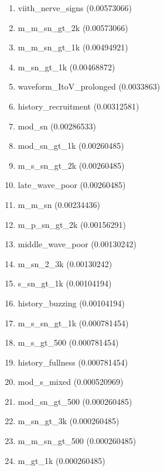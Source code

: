 \begin{enumerate}
\item viith\_nerve\_signs (0.00573066)
\item m\_m\_sn\_gt\_2k (0.00573066)
\item m\_m\_sn\_gt\_1k (0.00494921)
\item m\_sn\_gt\_1k (0.00468872)
\item waveform\_ItoV\_prolonged (0.0033863)
\item history\_recruitment (0.00312581)
\item mod\_sn (0.00286533)
\item mod\_sn\_gt\_1k (0.00260485)
\item m\_s\_sn\_gt\_2k (0.00260485)
\item late\_wave\_poor (0.00260485)
\item m\_m\_sn (0.00234436)
\item m\_p\_sn\_gt\_2k (0.00156291)
\item middle\_wave\_poor (0.00130242)
\item m\_sn\_2\_3k (0.00130242)
\item s\_sn\_gt\_1k (0.00104194)
\item history\_buzzing (0.00104194)
\item m\_s\_sn\_gt\_1k (0.000781454)
\item m\_s\_gt\_500 (0.000781454)
\item history\_fullness (0.000781454)
\item mod\_s\_mixed (0.000520969)
\item mod\_sn\_gt\_500 (0.000260485)
\item m\_sn\_gt\_3k (0.000260485)
\item m\_m\_sn\_gt\_500 (0.000260485)
\item m\_gt\_1k (0.000260485)
\end{enumerate}